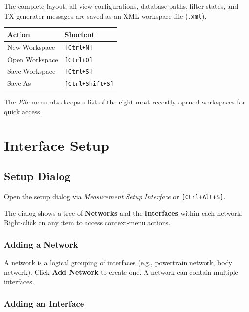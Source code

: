 \documentclass[a4paper,11pt]{article}
\newcommand{\key}[1]{\texttt{\small[#1]}}
\newcommand{\menu}[1]{\textit{#1}}
\newcommand{\ui}[1]{\textbf{#1}}
\newcommand{\file}[1]{\texttt{#1}}
\begin{document}
The complete layout, all view configurations, database paths, filter states, and
TX generator messages are saved as an XML workspace file (\file{.xml}).

\begin{table}[h]
  \centering
  \begin{tabularx}{0.75\textwidth}{lX}
    \toprule
    \textbf{Action} & \textbf{Shortcut} \\
    \midrule
    New Workspace     & \key{Ctrl+N} \\
    Open Workspace    & \key{Ctrl+O} \\
    Save Workspace    & \key{Ctrl+S} \\
    Save As           & \key{Ctrl+Shift+S} \\
    \bottomrule
  \end{tabularx}
\end{table}

The \menu{File} menu also keeps a list of the eight most recently opened workspaces for
quick access.

\section{Interface Setup}
\label{sec:setup}

\subsection{Setup Dialog}

Open the setup dialog via \menu{Measurement \textrightarrow{} Setup Interface} or
\key{Ctrl+Alt+S}.

The dialog shows a tree of \textbf{Networks} and the \textbf{Interfaces} within each network.
Right-click on any item to access context-menu actions.

\subsubsection{Adding a Network}

A network is a logical grouping of interfaces (e.g., powertrain network, body network).
Click \ui{Add Network} to create one. A network can contain multiple interfaces.

\subsubsection{Adding an Interface}
\end{document}
